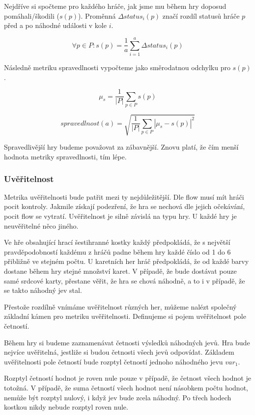 Nejdříve si spočteme pro každého hráče, jak jsme mu během hry doposud pomáhali/škodili ($s(p)$). Proměnná $\Delta status_i(p)$ značí rozdíl statusů hráče $p$ před a po náhodné události v kole $i$.

	\[
	\forall p \in P : s(p) = \frac{1}{a}\sum_{i=1}^a \Delta status_i(p)
\]

Následně metriku spravedlnosti vypočteme jako směrodatnou odchylku pro $s(p)$.

	\[
	\mu_s = \frac{1}{|P|}\sum_{p \in P} s(p)
\]

	\[
	spravedlnost(a) = \sqrt{\frac{1}{|P|}\sum_{p \in P} |\mu_s - s(p)|^2}
\]

Spravedlivější hry budeme považovat za zábavnější. Znovu platí, že čím menší hodnota metriky spravedlnosti, tím lépe.

\subsubsection{Uvěřitelnost}

Metrika uvěřitelnosti bude patřit mezi ty nejdůležitější. Dle flow musí mít hráči pocit kontroly. Jakmile získají podezření, že hra se nechová dle jejich očekávání, pocit flow se vytratí. Uvěřitelnost je silně závislá na typu hry. U každé hry je neuvěřitelné něco jiného. 

Ve hře obsahující hrací šestihranné kostky každý předpokládá, že s největší pravděpodobností každému z hráčů padne během hry každé číslo od 1 do 6 přibližně ve stejném počtu. U karetních her hráč předpokládá, že od každé barvy dostane během hry stejné množství karet. V případě, že bude dostávat pouze samé srdcové karty, přestane věřit, že hra se chová náhodně, a to i v případě, že se takto náhodný jev stal.

Přestože rozdílně vnímáme uvěřitelnost různých her, můžeme nalézt společný základní kámen pro metriku uvěřitelnosti. Definujeme si pojem uvěřitelnost pole četností.

Během hry si budeme zaznamenávat četnosti výsledků náhodných jevů. Hra bude nejvíce uvěřitelná, jestliže si budou četnosti všech jevů odpovídat. Základem uvěřitelnosti pole četností bude rozptyl četností jednoho náhodného jevu $var_1$.

Rozptyl četností hodnot je roven nule pouze v případě, že četnost všech hodnot je totožná. V případě, že suma četností všech hodnot není násobkem počtu hodnot, nemůže být rozptyl nulový, i když jev bude zcela náhodný. Po třech hodech kostkou nikdy nebude rozptyl roven nule. 

